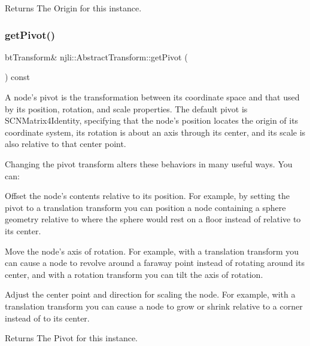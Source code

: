 \begin{DoxyReturn}{Returns}
The Origin for this instance. 
\end{DoxyReturn}
\mbox{\label{classnjli_1_1_abstract_transform_aec6866eb4cc32cc1f7aecae2f5a55422}} 
\subsubsection{\texorpdfstring{get\+Pivot()}{getPivot()}}
{\footnotesize\ttfamily bt\+Transform\& njli\+::\+Abstract\+Transform\+::get\+Pivot (\begin{DoxyParamCaption}{ }\end{DoxyParamCaption}) const}

A node’s pivot is the transformation between its coordinate space and that used by its position, rotation, and scale properties. The default pivot is S\+C\+N\+Matrix4\+Identity, specifying that the node’s position locates the origin of its coordinate system, its rotation is about an axis through its center, and its scale is also relative to that center point.

Changing the pivot transform alters these behaviors in many useful ways. You can\+:

Offset the node’s contents relative to its position. For example, by setting the pivot to a translation transform you can position a node containing a sphere geometry relative to where the sphere would rest on a floor instead of relative to its center.

Move the node’s axis of rotation. For example, with a translation transform you can cause a node to revolve around a faraway point instead of rotating around its center, and with a rotation transform you can tilt the axis of rotation.

Adjust the center point and direction for scaling the node. For example, with a translation transform you can cause a node to grow or shrink relative to a corner instead of to its center.

\begin{DoxyReturn}{Returns}
The Pivot for this instance. 
\end{DoxyReturn}
\mbox{\label{classnjli_1_1_abstract_transform_ab998267bb4662fa0c3902b9a236f15fc}} 
